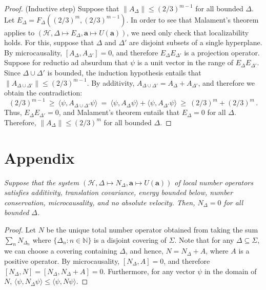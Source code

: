 \documentclass[12pt]{article}
\theoremstyle{remark}
\newcommand{\norm}[1]{\mbox{$\| #1\|$}}
\newcommand{\hil}[1]{\mathcal{#1}}
\begin{document}
\begin{appendix}
\begin{proof}
  (Inductive step) Suppose that $\norm{A_{\Delta}}\leq (2/3)^{m-1}$
  for all bounded $\Delta$.  Let $E_{\Delta}=F_{\Delta} (
  (2/3)^{m},(2/3)^{m-1})$.  In order to see that Malament's theorem
  applies to $(\hil{H},\Delta \mapsto E_{\Delta},\mathbf{a}\mapsto
  U(\mathbf{a}))$, we need only check that localizability holds.  For
  this, suppose that $\Delta$ and $\Delta '$ are disjoint subsets of a
  single hyperplane.  By microcausality, $[A_{\Delta},A_{\Delta
    '}]=0$, and therefore $E_{\Delta}E_{\Delta '}$ is a projection
  operator.  Suppose for reductio ad absurdum that $\psi$ is a unit
  vector in the range of $E_{\Delta}E_{\Delta '}$.  Since $\Delta \cup
  \Delta '$ is bounded, the induction hypothesis entails that
  $\norm{A_{\Delta \cup \Delta '}}\leq (2/3)^{m-1}$.  By additivity,
  $A_{\Delta \cup \Delta '}=A_{\Delta}+A_{\Delta '}$, and therefore we
  obtain the contradiction:
\begin{equation}
(2/3)^{m-1} \:\geq \:\langle \psi,A_{\Delta \cup \Delta '}\psi \rangle
\: = \: \langle \psi ,A_{\Delta}\psi \rangle +\langle \psi ,A_{\Delta '}\psi \rangle 
\:\geq \: (2/3)^{m}+(2/3)^{m} \,.\end{equation}
Thus, $E_{\Delta}E_{\Delta '}=0$, and Malament's
theorem entails that $E_{\Delta }=0$ for all $\Delta$.  
Therefore, $\norm{A_{\Delta}}\leq (2/3)^{m}$ for all bounded $\Delta$.  \end{proof}

\section{Appendix}
\vspace{1em}   {\it Suppose that
  the system $(\hil{H},\Delta \mapsto N_{\Delta},\mathbf{a}\mapsto
  U(\mathbf{a}))$ of local number operators satisfies additivity,
  translation covariance, energy bounded below, number conservation,
  microcausality, and no absolute velocity.  Then, $N_{\Delta }=0$ for
  all bounded $\Delta$.}

\begin{proof} Let $N$ be the unique total number operator obtained
  from taking the sum $\sum _{n}N_{\Delta _{n}}$ where $\{ \Delta
  _{n}:n\in \mathbb{N}\}$ is a disjoint covering of $\Sigma$.  Note
  that for any $\Delta \subseteq \Sigma$, we can choose a covering
  containing $\Delta$, and hence, $N=N_{\Delta}+A$, where $A$ is a
  positive operator.  By microcausality, $[N_{\Delta},A]=0$, and
  therefore $[N_{\Delta},N]=[N_{\Delta},N_{\Delta}+A]=0$.
  Furthermore, for any vector $\psi$ in the domain of $N$, $\langle
  \psi ,N_{\Delta}\psi \rangle \leq \langle \psi ,N\psi \rangle$.
  

\end{proof}
\end{appendix}
\end{document}
